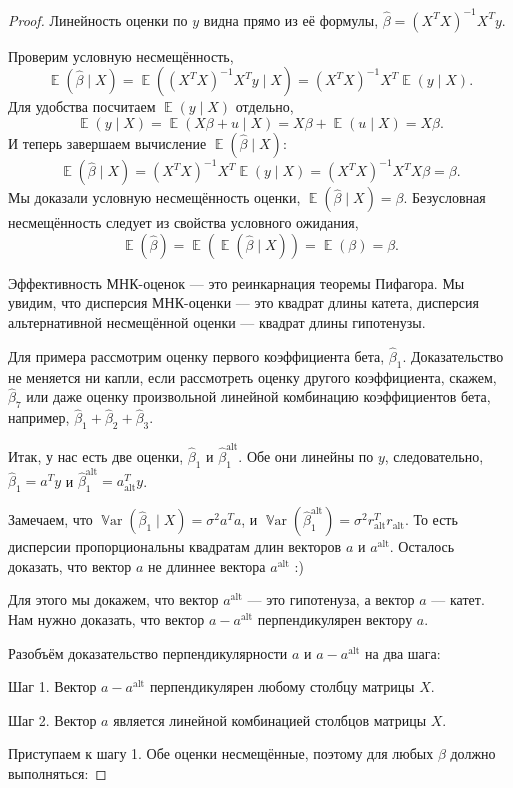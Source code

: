 \documentclass[12pt]{article}
\DeclareMathOperator{\Var}{\mathbb{V}ar}
\DeclareMathOperator{\E}{\mathbb{E}}
\newcommand{\hb}{\hat{\beta}}
\newcommand{\alt}{\text{alt}}
\begin{document}
\begin{proof}
Линейность оценки по $y$ видна прямо из её формулы, $\hb = (X^TX)^{-1}X^Ty$.

Проверим условную несмещённость, 
\[
\E(\hb \mid X) = \E((X^TX)^{-1}X^Ty \mid X) = (X^TX)^{-1}X^T\E(y \mid X).
\]
Для удобства посчитаем $\E(y \mid X)$ отдельно,
\[
\E(y \mid X) = \E(X\beta + u \mid X) = X\beta + \E(u \mid X) = X\beta.
\]
И теперь завершаем вычисление $\E(\hb \mid X)$:
\[
\E(\hb \mid X) = (X^TX)^{-1}X^T\E(y \mid X) = (X^TX)^{-1}X^TX\beta = \beta.
\]
Мы доказали условную несмещённость оценки, $\E(\hb \mid X) = \beta$.
Безусловная несмещённость следует из свойства условного ожидания,
\[
\E(\hb) = \E(\E(\hb \mid X)) = \E(\beta) = \beta.
\]

Эффективность МНК-оценок — это реинкарнация теоремы Пифагора. 
Мы увидим, что дисперсия МНК-оценки — это квадрат длины катета, 
дисперсия альтернативной несмещённой оценки — квадрат длины гипотенузы.

Для примера рассмотрим оценку первого коэффициента бета, $\hb_1$.
Доказательство не меняется ни капли, если рассмотреть оценку другого коэффициента, скажем, $\hb_7$ или даже оценку произвольной линейной комбинацию коэффициентов бета, например, $\hb_1 + \hb_2 + \hb_3$.

Итак, у нас есть две оценки, $\hb_1$ и $\hb_1^{\alt}$. 
Обе они линейны по $y$, следовательно, $\hb_1 = a^T y$ и $\hb_1^{\alt} = a^T_{\alt} y$.


Замечаем, что $\Var(\hb_1 \mid X) = \sigma^2 a^Ta$, и $\Var(\hb_1^{\alt}) = \sigma^2 r_{\alt}^Tr_{\alt}$. 
То есть дисперсии пропорциональны квадратам длин векторов $a$ и $a^{\alt}$. 
Осталось доказать, что вектор $a$ не длиннее вектора $a^{\alt}$ :)

Для этого мы докажем, что вектор $a^{\alt}$ — это гипотенуза, а вектор $a$ — катет. 
Нам нужно доказать, что вектор $a - a^{\alt}$ перпендикулярен вектору $a$.

Разобъём доказательство перпендикулярности $a$ и $a-a^{\alt}$ на два шага:

Шаг 1. Вектор $a - a^{\alt}$ перпендикулярен любому столбцу матрицы $X$.

Шаг 2. Вектор $a$ является линейной комбинацией столбцов матрицы $X$.






Приступаем к шагу 1. Обе оценки несмещённые, поэтому для любых $\beta$ должно выполняться:


\end{proof}
\end{document}
